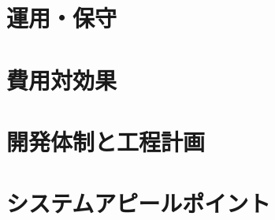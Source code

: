 \documentclass{jlreq}
\begin{document}
\section{運用・保守}


\section{費用対効果}


\section{開発体制と工程計画}


\section{システムアピールポイント}

\end{document}
